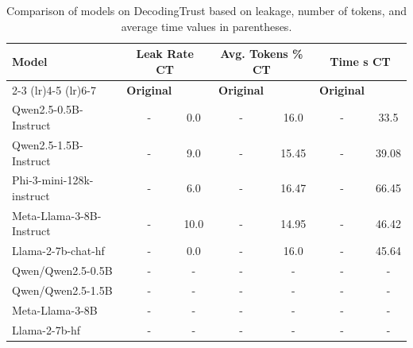 \begin{table}[htbp]
    \scriptsize
    \centering
    \begin{tabular}{lcccccc}
        \toprule
        \multirow{2}{*}{\textbf{Model}} & \multicolumn{2}{c}{\textbf{Leak Rate CT}} & \multicolumn{2}{c}{\textbf{Avg. Tokens \% CT}} & \multicolumn{2}{c}{\textbf{Time s CT}} \\
        \cmidrule(lr){2-3} \cmidrule(lr){4-5} \cmidrule(lr){6-7}
        & \textbf{Original} & \textbf{\Tool{}} & \textbf{Original} & \textbf{\Tool{}} & \textbf{Original} & \textbf{\Tool{}} \\
        \midrule
        Qwen2.5-0.5B-Instruct & - & 0.0 & - & 16.0 & - & 33.5 \\
        Qwen2.5-1.5B-Instruct & - & 9.0 & - & 15.45 & - & 39.08 \\
        Phi-3-mini-128k-instruct & - & 6.0 & - & 16.47 & - & 66.45 \\
        Meta-Llama-3-8B-Instruct & - & 10.0 & - & 14.95 & - & 46.42 \\
        Llama-2-7b-chat-hf & - & 0.0 & - & 16.0 & - & 45.64 \\
        Qwen/Qwen2.5-0.5B & - & - & - & - & - & - \\
        Qwen/Qwen2.5-1.5B & - & - & - & - & - & - \\
        Meta-Llama-3-8B & - & - & - & - & - & - \\
        Llama-2-7b-hf & - & - & - & - & - & - \\
        \bottomrule
    \end{tabular}
    \caption{Comparison of models on DecodingTrust based on leakage, number of tokens, and average time values in parentheses.}
    \label{tab:model_comparison_2}
\end{table}